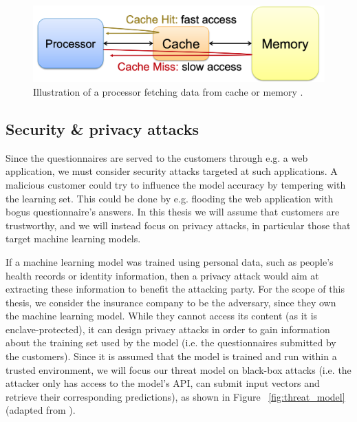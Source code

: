 \begin{figure}[h!]
	\center
	\includegraphics[scale=0.35]{images/introduction/cache}
	\caption{\label{fig:cache} Illustration of a processor fetching data from cache or memory \cite{intel_slides}.}
\end{figure}

\subsection{Security \& privacy attacks}

Since the questionnaires are served to the customers through e.g. a web application, we must consider security attacks targeted at such applications. A malicious customer could try to influence the model accuracy by tempering with the learning set. This could be done by e.g. flooding the web application with bogus questionnaire's answers. In this thesis we will assume that customers are trustworthy, and we will instead focus on privacy attacks, in particular those that target machine learning models.

If a machine learning model was trained using personal data, such as people's health records or identity information, then a privacy attack would aim at extracting these information to benefit the attacking party. For the scope of this thesis, we consider the insurance company to be the adversary, since they own the machine learning model. While they cannot access its content (as it is enclave-protected), it can design privacy attacks in order to gain information about the training set used by the model (i.e. the questionnaires submitted by the customers). Since it is assumed that the model is trained and run within a trusted environment, we will focus our threat model on black-box attacks (i.e. the attacker only has access to the model's API, can submit input vectors and retrieve their corresponding predictions), as shown in Figure ~\ref{fig:threat_model} (adapted from \cite{ml_survey}).

